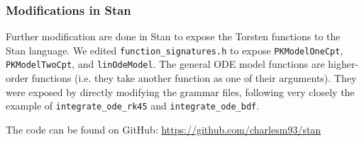 \documentclass[11pt]{amsart}
\begin{document}
\subsubsection*{Modifications in Stan}
Further modification are done in Stan to expose the Torsten functions to the Stan language. We edited \texttt{function\_signatures.h} to expose \texttt{PKModelOneCpt}, \texttt{PKModelTwoCpt}, and \texttt{linOdeModel}. The general ODE model functions are higher-order functions (i.e. they take another function as one of their arguments). They were exposed by directly modifying the grammar files, following very closely the example of \texttt{integrate\_ode\_rk45} and \texttt{integrate\_ode\_bdf}.

The code can be found on GitHub:  \url{https://github.com/charlesm93/stan}




\end{document}

